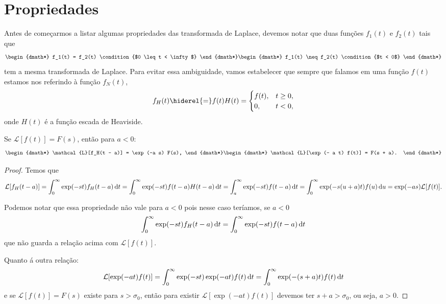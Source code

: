 \section{Propriedades}
Antes de começarmos a listar algumas propriedades das transformada de Laplace,
devemos notar que duas funções $f_1(t)$ e $f_2(t)$ tais que
\begin{dgroup*}
  \begin{dmath*}
    f_1(t) = f_2(t) \condition{$0 \leq t < \infty$}
  \end{dmath*}
  \begin{dmath*}
    f_1(t) \neq f_2(t) \condition{$t < 0$}
  \end{dmath*}
\end{dgroup*}
tem a mesma transformada de Laplace. Para evitar essa ambiguidade, vamos
estabelecer que sempre que falamos em uma função $f(t)$ estamos nos referindo à
função $f_N(t)$,
\begin{dmath*}
  f_H(t) \hiderel{=} f(t) H(t) = \begin{cases}
    f(t), & t \geq 0, \\
    0, & t < 0,
  \end{cases}
\end{dmath*}
onde $H(t)$ é a função escada de Heaviside.

\begin{lem}[Translação]
  Se $\mathcal{L}[f(t)] = F(s)$, então para $a < 0$:
  \begin{dgroup*}
    \begin{dmath*}
      \mathcal{L}[f_H(t - a)] = \exp(-a s) F(s),
    \end{dmath*}
    \begin{dmath*}
      \mathcal{L}[\exp(- a t) f(t)] = F(s + a).
    \end{dmath*}
  \end{dgroup*}
\end{lem}
\begin{proof}
  Temos que
  \begin{dmath*}
    \mathcal{L}[f_H(t - a)] = \int_0^{\infty} \exp(-s t) f_H(t - a) \vi{t}
    = \int_0^{\infty} \exp(-s t) f(t - a) H(t - a) \vi{t}
    = \int_a^{\infty} \exp(-s t) f(t - a) \vi{t}
    = \int_0^{\infty} \exp(-s (u + a)t) f(u) \vi{u}
    = \exp(-a s) \mathcal{L}[f(t)].
  \end{dmath*}

  Podemos notar que essa propriedade não vale para $a < 0$ pois nesse caso
  teríamos, se $a < 0$
  \begin{dmath*}
    \int_0^{\infty} \exp(-s t) f_H(t - a) \vi{t} = \int_0^{\infty} \exp(-s t)
    f(t - a) \vi{t}
  \end{dmath*}
  que não guarda a relação acima com $\mathcal{L}[f(t)]$.

  Quanto á outra relação:
  \begin{dmath*}
    \mathcal{L}[\exp(-a t) f(t)] = \int_0^{\infty} \exp(-s t) \exp(-a t) f(t)
    \vi{t}
    = \int_0^{\infty} \exp(-(s + a) t) f(t) \vi{t}
  \end{dmath*}
  e se $\mathcal{L}[f(t)] = F(s)$ existe para $s > \sigma_0$, então para existir
  $\mathcal{L}[\exp(-a t) f(t)]$ devemos ter $s + a > \sigma_0$, ou seja, $a >
  0$.
\end{proof}

